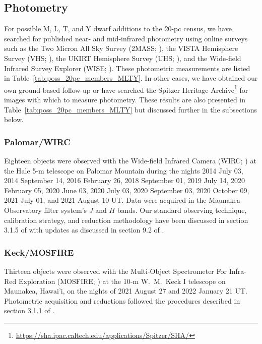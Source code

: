 \documentclass[twocolumn,tighten,twocolappendix]{aastex631}
\begin{document}
\subsection{Photometry\label{sec:appendix_photometry}}

For possible M, L, T, and Y dwarf additions to the 20-pc census, we have searched for published near- and mid-infrared photometry using online surveys such as the Two Micron All Sky Survey (2MASS; \citealt{skrutskie2006}), the VISTA Hemisphere Survey (VHS; \citealt{mcmahon2013}), the UKIRT Hemisphere Survey (UHS; \citealt{dye2018}), and the Wide-field Infrared Survey Explorer (WISE; \citealt{wright2010}). These photometric measurements are listed in Table~\ref{tab:poss_20pc_members_MLTY}. In other cases, we have obtained our own ground-based follow-up or have searched the Spitzer Heritage Archive\footnote{\url {https://sha.ipac.caltech.edu/applications/Spitzer/SHA/}} for images with which to measure photometry. These results are also presented in Table~\ref{tab:poss_20pc_members_MLTY} but discussed further in the subsections below.

\subsubsection{Palomar/WIRC}

Eighteen objects were observed with the Wide-field Infrared Camera (WIRC; \citealt{wilson2003b}) at the Hale 5-m telescope on Palomar Mountain during the nights 2014 July 03, 2014 September 14, 2016 February 26, 2018 September 01, 2019 July 14, 2020 February 05, 2020 June 03, 2020 July 03, 2020 September 03, 2020 October 09, 2021 July 01, and 2021 August 10 UT. Data were acquired in the Maunakea Observatory filter system's $J$ and $H$ bands. Our standard observing technique, calibration strategy, and reduction methodology have been discussed in section 3.1.5 of \cite{kirkpatrick2011} with updates as discussed in section 9.2 of \cite{meisner2020a}.

\subsubsection{Keck/MOSFIRE}

Thirteen objects were observed with the Multi-Object Spectrometer For Infra-Red Exploration (MOSFIRE; \citealt{mclean2012}) at the 10-m W.\ M.\ Keck I telescope on Maunakea, Hawai'i, on the nights of 2021 August 27 and 2022 January 21 UT. Photometric acquisition and reductions followed the procedures described in section 3.1.1 of \cite{schneider2021}.
\end{document}
